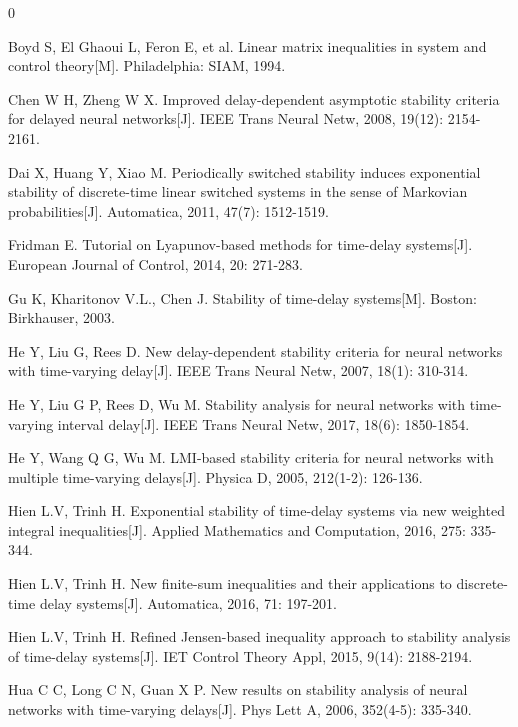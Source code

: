 \documentclass[a4paper, 12pt, oneside]{article}
\theoremstyle{cn_theorem}
\begin{document}
{\songti\rmfamily
\begin{thebibliography}{0}
\vspace{-1.7em}

 Boyd S, El Ghaoui L, Feron E, et al. Linear matrix inequalities in system and control theory[M]. Philadelphia: SIAM, 1994.

 Chen W H, Zheng W X. Improved delay-dependent asymptotic stability criteria for delayed neural networks[J]. IEEE Trans Neural Netw, 2008, 19(12): 2154-2161.

 Dai X, Huang Y, Xiao M. Periodically switched stability induces exponential stability of discrete-time linear switched systems in the sense of Markovian probabilities[J]. Automatica, 2011, 47(7): 1512-1519.

 Fridman E. Tutorial on Lyapunov-based methods for time-delay systems[J]. European Journal of Control, 2014, 20: 271-283.

 Gu K, Kharitonov V.L., Chen J. Stability of time-delay systems[M]. Boston: Birkhauser, 2003.

 He Y, Liu G, Rees D. New delay-dependent stability criteria for neural networks with time-varying delay[J]. IEEE Trans Neural Netw, 2007, 18(1): 310-314.

 He Y, Liu G P, Rees D, Wu M. Stability analysis for neural networks with time-varying interval delay[J]. IEEE Trans Neural Netw, 2017, 18(6): 1850-1854.

 He Y, Wang Q G, Wu M. LMI-based stability criteria for neural networks with multiple time-varying delays[J]. Physica D, 2005, 212(1-2): 126-136.

 Hien L.V, Trinh H. Exponential stability of time-delay systems via new weighted integral inequalities[J]. Applied Mathematics and Computation, 2016, 275: 335-344.

 Hien L.V, Trinh H. New finite-sum inequalities and their applications to discrete-time delay systems[J]. Automatica, 2016, 71: 197-201.

 Hien L.V, Trinh H. Refined Jensen-based inequality approach to stability analysis of time-delay systems[J]. IET Control Theory Appl, 2015, 9(14): 2188-2194.

 Hua C C, Long C N, Guan X P. New results on stability analysis of neural networks with time-varying delays[J]. Phys Lett A, 2006, 352(4-5): 335-340.


\end{thebibliography}}
\end{document}
